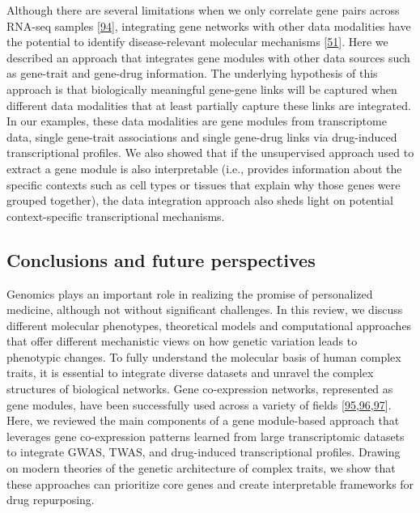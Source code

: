 Although there are several limitations when we only correlate gene pairs across RNA-seq samples {[}\protect\hyperlink{ref-jVQ2rMqc}{94}{]}, integrating gene networks with other data modalities have the potential to identify disease-relevant molecular mechanisms {[}\protect\hyperlink{ref-dg9nKuy0}{51}{]}.
Here we described an approach that integrates gene modules with other data sources such as gene-trait and gene-drug information.
The underlying hypothesis of this approach is that biologically meaningful gene-gene links will be captured when different data modalities that at least partially capture these links are integrated.
In our examples, these data modalities are gene modules from transcriptome data, single gene-trait associations and single gene-drug links via drug-induced transcriptional profiles.
We also showed that if the unsupervised approach used to extract a gene module is also interpretable (i.e., provides information about the specific contexts such as cell types or tissues that explain why those genes were grouped together), the data integration approach also sheds light on potential context-specific transcriptional mechanisms.

\hypertarget{conclusions-and-future-perspectives}{%
\subsection{Conclusions and future perspectives}\label{conclusions-and-future-perspectives}}

Genomics plays an important role in realizing the promise of personalized medicine, although not without significant challenges.
In this review, we discuss different molecular phenotypes, theoretical models and computational approaches that offer different mechanistic views on how genetic variation leads to phenotypic changes.
To fully understand the molecular basis of human complex traits, it is essential to integrate diverse datasets and unravel the complex structures of biological networks.
Gene co-expression networks, represented as gene modules, have been successfully used across a variety of fields {[}\protect\hyperlink{ref-CqvNaEqc}{95},\protect\hyperlink{ref-r8alvfcC}{96},\protect\hyperlink{ref-E1tpJnqG}{97}{]}.
Here, we reviewed the main components of a gene module-based approach that leverages gene co-expression patterns learned from large transcriptomic datasets to integrate GWAS, TWAS, and drug-induced transcriptional profiles.
Drawing on modern theories of the genetic architecture of complex traits, we show that these approaches can prioritize core genes and create interpretable frameworks for drug repurposing.

